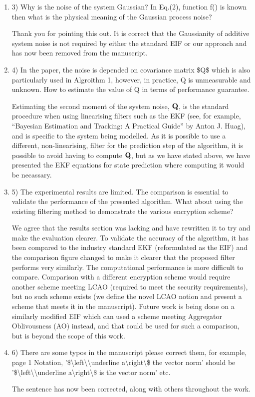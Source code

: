 \documentclass[a4paper]{scrartcl}
\newenvironment{rebuttal}{\begin{enumerate}[label={\color{grey}\thesection.\arabic{enumi}},leftmargin=0pt,ref=\thesection.\arabic{enumi}]}{\end{enumerate}}
\newcommand{\reviewtext}[1]{{\color{nblue} #1}}
\begin{document}
\begin{rebuttal}
\item \reviewtext{3) Why is the noise of the system Gaussian? In Eq.(2), function f() is known then what is the physical meaning of the Gaussian process noise?}

Thank you for pointing this out. It is correct that the Gaussianity of additive system noise is not required by either the standard EIF or our approach and has now been removed from the manuscript.

\item \reviewtext{4) In the paper, the noise is depended on covariance matrix \$Q\$ which is also particularly used in Algroithm 1, however, in practice, Q is unmeasurable and unknown. How to estimate the value of Q in terms of performance guarantee.}

Estimating the second moment of the system noise, ${{\mathbf{Q}}}$, is the standard procedure when using linearising filters such as the EKF (see, for example, ``Bayesian Estimation and Tracking: A Practical Guide'' by Anton J. Huag), and is specific to the system being modelled. As it is possible to use a different, non-linearising, filter for the prediction step of the algorithm, it is possible to avoid having to compute ${{\mathbf{Q}}}$, but as we have stated above, we have presented the EKF equations for state prediction where computing it would be necassary.

\item \reviewtext{5) The experimental results are limited. The comparison is essential to validate the performance of the presented algorithm. What about using the existing filtering method to demonstrate the various encryption scheme?}

We agree that the results section was lacking and have rewritten it to try and make the evaluation clearer. To validate the accuracy of the algorithm, it has been compared to the industry standard EKF (reformulated as the EIF) and the comparison figure changed to make it clearer that the proposed filter performs very similarly. The computational performance is more difficult to compare. Comparison with a different encryption scheme would require another scheme meeting LCAO (required to meet the security requirements), but no such scheme exists (we define the novel LCAO notion and present a scheme that meets it in the manuscript). Future work is being done on a similarly modified EIF which can used a scheme meeting Aggregator Oblivousness (AO) instead, and that could be used for such a comparison, but is beyond the scope of this work.

\item \reviewtext{6) There are some typos in the manuscript please correct them, for example, page 1 Notation, '\$\textbackslash left\textbackslash\textbar\textbackslash underline a\textbackslash right\textbackslash\textbar\$ the vector norm' should be '\$\textbackslash left\textbackslash\textbar\textbackslash underline a\textbackslash right\textbackslash\textbar\$ is the vector norm' etc.}

The sentence has now been corrected, along with others throughout the work.

\end{rebuttal}

% 
\end{document}
